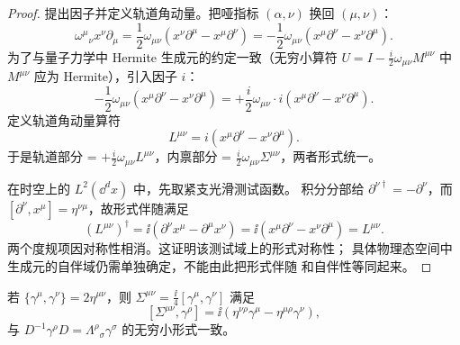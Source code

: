 \begin{proof}
提出因子并定义轨道角动量。把哑指标 $(\alpha,\nu)$ 换回 $(\mu,\nu)$：
\begin{equation*}
\omega^\mu{}_\nu x^\nu\partial_\mu=\frac{1}{2}\omega_{\mu\nu}(x^\nu\partial^\mu-x^\mu\partial^\nu)=-\frac{1}{2}\omega_{\mu\nu}(x^\mu\partial^\nu-x^\nu\partial^\mu).
\end{equation*}
为了与量子力学中 Hermite 生成元的约定一致（无穷小算符 $U=I-\frac{i}{2}\omega_{\mu\nu}M^{\mu\nu}$ 中 $M^{\mu\nu}$ 应为 Hermite），引入因子 $i$：
\begin{equation*}
-\frac{1}{2}\omega_{\mu\nu}(x^\mu\partial^\nu-x^\nu\partial^\mu)=+\frac{i}{2}\omega_{\mu\nu}\cdot i(x^\mu\partial^\nu-x^\nu\partial^\mu).
\end{equation*}
定义轨道角动量算符
\begin{equation}\label{eq:ms-poincare-L-def}
L^{\mu\nu}=i(x^\mu\partial^\nu-x^\nu\partial^\mu).
\end{equation}
于是轨道部分 = $+\frac{i}{2}\omega_{\mu\nu}L^{\mu\nu}$，内禀部分 = $\frac{i}{2}\omega_{\mu\nu}\Sigma^{\mu\nu}$，两者形式统一。

在时空上的 $L^2(\dd^dx)$ 中，先取紧支光滑测试函数。
积分分部给 $\partial^{\nu\dagger}=-\partial^\nu$，而
$[\partial^\nu,x^\mu]=\eta^{\nu\mu}$，故形式伴随满足
\begin{equation*}
(L^{\mu\nu})^\dagger
=\ii(\partial^\nu x^\mu-\partial^\mu x^\nu)
=\ii(x^\mu\partial^\nu-x^\nu\partial^\mu)=L^{\mu\nu}.
\end{equation*}
两个度规项因对称性相消。这证明该测试域上的形式对称性；
具体物理态空间中生成元的自伴域仍需单独确定，不能由此把形式伴随
和自伴性等同起来。
\end{proof}

\begin{proposition}
若 $\{\gamma^\mu,\gamma^\nu\}=2\eta^{\mu\nu}$，则 $\Sigma^{\mu\nu}=\frac{\ii}{4}[\gamma^\mu,\gamma^\nu]$ 满足\[[\Sigma^{\mu\nu},\gamma^\rho]=\ii(\eta^{\nu\rho}\gamma^\mu-\eta^{\mu\rho}\gamma^\nu),\]与 $D^{-1}\gamma^\rho D=\Lambda^\rho{}_\sigma\gamma^\sigma$ 的无穷小形式一致。
\end{proposition}


